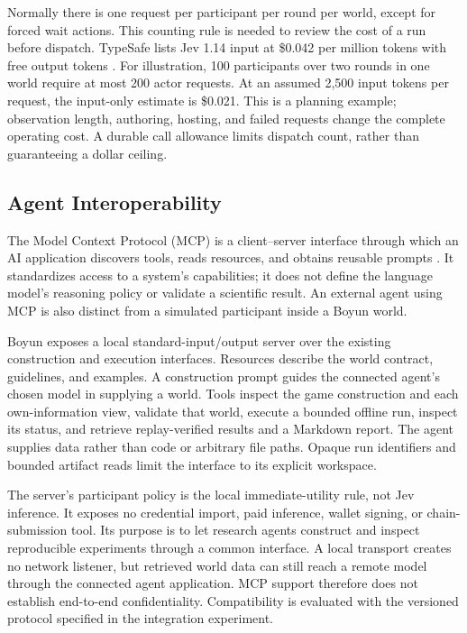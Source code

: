 Normally there is one request per participant per round per world, except for
forced wait actions. This counting rule is needed to review the cost of a run
before dispatch. TypeSafe lists Jev 1.14 input at \$0.042 per million tokens
with free output tokens \cite{typesafemodels}. For illustration, 100 participants
over two rounds in one world require at most 200 actor requests. At an assumed
2,500 input tokens per request, the input-only estimate is \$0.021. This is a
planning example; observation length, authoring, hosting, and failed requests
change the complete operating cost. A durable call allowance limits dispatch
count, rather than guaranteeing a dollar ceiling.

\subsection{Agent Interoperability}\label{sec:mcp}
The Model Context Protocol (MCP) is a client--server interface through which
an AI application discovers tools, reads resources, and obtains reusable
prompts \cite{mcp2025}. It standardizes access to a system's capabilities;
it does not define the language model's reasoning policy or validate a
scientific result. An external agent using MCP is also distinct from a
simulated participant inside a Boyun world.

Boyun exposes a local standard-input/output server over the existing
construction and execution interfaces. Resources describe the world contract,
guidelines, and examples. A construction prompt guides the connected agent's
chosen model in supplying a world. Tools inspect the game construction and each own-information view, validate
that world, execute a bounded
offline run, inspect its status, and retrieve replay-verified results and a
Markdown report. The agent supplies data rather than code or arbitrary file
paths. Opaque run identifiers and bounded artifact reads limit the interface
to its explicit workspace.

The server's participant policy is the local immediate-utility rule, not Jev
inference. It exposes no credential import, paid inference, wallet signing,
or chain-submission tool. Its purpose is to let research agents construct
and inspect reproducible experiments through a common interface. A local
transport creates no network listener, but retrieved world data can still
reach a remote model through the connected agent application. MCP support
therefore does not establish end-to-end confidentiality. Compatibility is
evaluated with the versioned protocol specified in the integration experiment.

